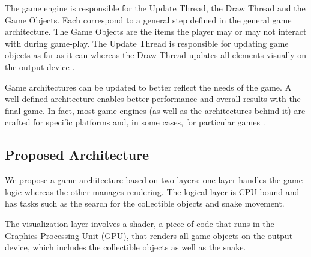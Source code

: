 \documentclass[runningheads]{llncs}
\begin{document}
The game engine is responsible for the Update Thread, the Draw Thread and the Game Objects. Each correspond to a general step defined in the general game architecture. The Game Objects are the items the player may or may not interact with during game-play. The Update Thread  is responsible for updating game objects as far as it can whereas the Draw Thread updates all elements visually on the output device \cite{portales}.

Game architectures can be updated to better reflect the needs of the game. A well-defined architecture enables better performance and overall results with the final game. In fact, most game engines (as well as the architectures behind it) are crafted for specific platforms and, in some cases, for particular games \cite{gregory_2019}.

\subsection{Proposed Architecture} \label{sec:proposed-architecture}
We propose a game architecture based on two layers:
one layer handles the game logic whereas the other manages rendering.  The logical layer is CPU-bound and has tasks such as the search for the collectible objects and snake movement.

The visualization layer involves a shader, a piece of code that runs in the Graphics Processing Unit (GPU), that renders all game objects on the output device, which includes the collectible objects as well as the snake.
\end{document}

